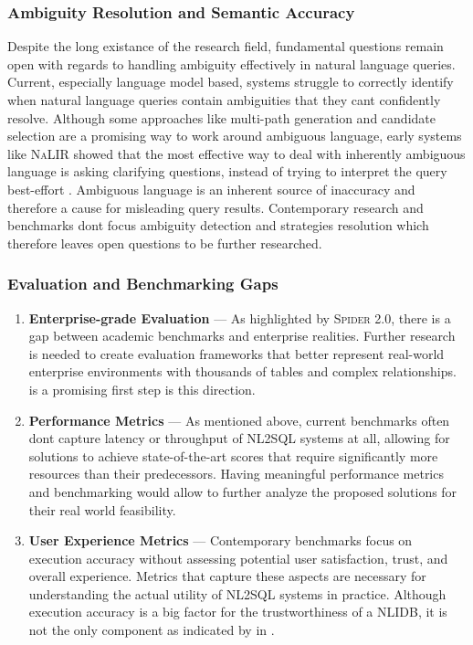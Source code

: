 \subsubsection{Ambiguity Resolution and Semantic Accuracy}

Despite the long existance of the research field, fundamental questions remain open with regards to handling ambiguity effectively
in natural language queries. Current, especially language model based, systems struggle to correctly identify when natural language
queries contain ambiguities that they cant confidently resolve. Although some approaches like multi-path generation and candidate 
selection are a promising way to work around ambiguous language, early systems like \textsc{NaLIR} showed that the most effective 
way to deal with inherently ambiguous language is asking clarifying questions, instead of trying to interpret the query best-effort
\citep{NALIR}. Ambiguous language is an inherent source of inaccuracy and therefore a cause for misleading query results. 
Contemporary research and benchmarks dont focus ambiguity detection and strategies resolution which therefore leaves open
questions to be further researched.

\subsubsection{Evaluation and Benchmarking Gaps}

\begin{enumerate}
    \item \textbf{Enterprise-grade Evaluation} — As highlighted by \textsc{Spider 2.0}, there is a gap between academic 
          benchmarks and enterprise realities. Further research is needed to create evaluation frameworks that better represent 
          real-world enterprise environments with thousands of tables and complex relationships. \cite{Spider2} is a promising 
          first step is this direction.
    \item \textbf{Performance Metrics} — As mentioned above, current benchmarks often dont capture latency or throughput of NL2SQL 
          systems at all, allowing for solutions to achieve state-of-the-art scores that require significantly more resources than 
          their predecessors. Having meaningful performance metrics and benchmarking would allow to further analyze the proposed 
          solutions for their real world feasibility.
    \item \textbf{User Experience Metrics} — Contemporary benchmarks focus on execution accuracy without assessing potential
          user satisfaction, trust, and overall experience. Metrics that capture these aspects are necessary for understanding the 
          actual utility of NL2SQL systems in practice. Although execution accuracy is a big factor for the trustworthiness of a 
          NLIDB, it is not the only component as indicated by \citeauthor*{NALIR} in \citeyear{NALIR}.
\end{enumerate}

